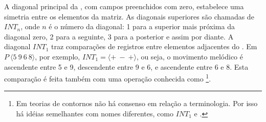 \begin{table}
  \centering
  \qquad
  \qquad
  \caption{Exemplos de }
  \label{tab:matriz-exemplos}
\end{table}

A diagonal principal da , com campos preenchidos com
zero, estabelece uma simetria entre os elementos da matriz. As
diagonais superiores são chamadas de $INT_n$, onde $n$ é o número da
diagonal: 1 para a superior mais próxima da diagonal zero, 2 para a
seguinte, 3 para a posterior e assim por diante. A diagonal $INT_1$
traz comparações de registros entre elementos adjacentes do
. Em $P\:\langle5\:9\:6\:8\rangle$, por exemplo,
$INT_1=\langle+\:-\:+\rangle$, ou seja, o movimento melódico é
ascendente entre 5 e 9, descendente entre 9 e 6, e ascendente entre 6
e 8. Esta comparação é feita também com uma operação conhecida como
 \footnote{Em teorias de contornos não há consenso em
  relação a terminologia. Por isso há idéias semelhantes com nomes
  diferentes, como $INT_1$ e 
  \cite{friedmann87:response}.}.

